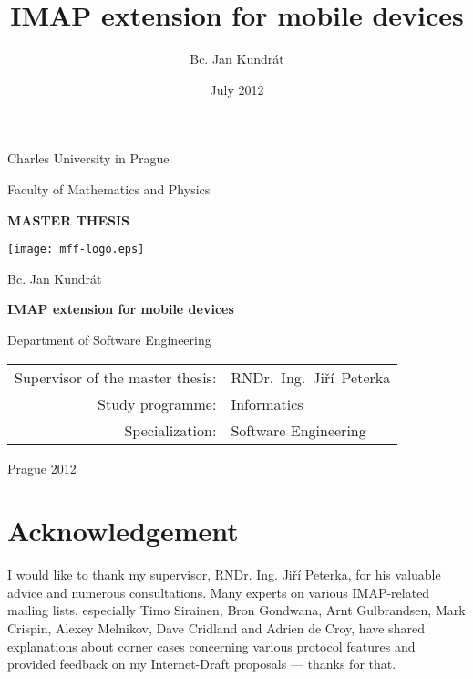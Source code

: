 \documentclass[11pt,a4paper]{report}
\begin{document}
\title{IMAP extension for mobile devices}

\author{Bc. Jan Kundrát}

\date{July 2012}

\begin{titlepage}
\begin{center}
\large

Charles University in Prague

\medskip

Faculty of Mathematics and Physics

\vfill

{\bf\Large MASTER THESIS}

\vfill

\centerline{\mbox{\texttt{[image: mff-logo.eps]}}}

\vfill
\vspace{5mm}

{\LARGE Bc. Jan Kundrát}

\vspace{15mm}

{\LARGE\bfseries IMAP extension for mobile devices}

\vfill

Department of Software Engineering

\vfill

\begin{tabular}{rl}

Supervisor of the master thesis: & RNDr.~Ing.~Jiří~Peterka \\
\noalign{\vspace{2mm}}
Study programme: & Informatics \\
\noalign{\vspace{2mm}}
Specialization: & Software Engineering \\
\end{tabular}

\vfill

Prague 2012

\end{center}
\end{titlepage}

\section*{Acknowledgement}
I would like to thank my supervisor, RNDr. Ing. Jiří Peterka, for his valuable advice and numerous consultations. Many
experts on various IMAP-related mailing lists, especially Timo Sirainen, Bron Gondwana, Arnt Gulbrandsen, Mark
Crispin, Alexey Melnikov, Dave Cridland and Adrien de Croy, have  shared explanations about corner cases concerning
various protocol features and provided feedback on my Internet-Draft proposals --- thanks for that.
\end{document}
